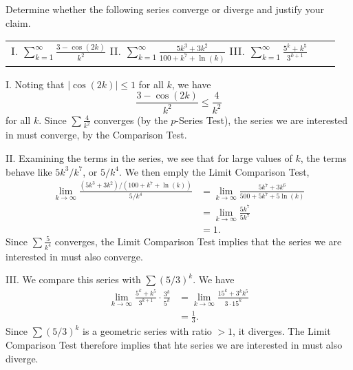 \documentclass[]{ximera}
\begin{document}
\begin{problem}
Determine whether the following series converge or diverge and justify your claim.
\begin{center}
\begin{tabular}{lll}
I. $\sum_{k=1}^\infty \frac{3-\cos(2k)}{k^2}$ \hspace{.3in} II. $\sum_{k=1}^\infty \frac{5k^3+3k^2}{100 + k^7 + \ln(k)}$ \hspace{.3in} III. $\sum_{k=1}^\infty \frac{5^k + k^5}{3^{k+1}}$
\end{tabular}
\end{center}

\begin{solution}
I. Noting that $|\cos(2k)| \leq 1$ for all $k$, we have
$$
\frac{3-\cos(2k)}{k^2} \leq \frac{4}{k^2}
$$
for all $k$. Since $\sum \frac{4}{k^2}$ converges (by the $p$-Series Test), the series we are interested in must converge, by the Comparison Test.

II. Examining the terms in the series, we see that for large values of $k$, the terms behave like $5k^3/k^7$, or $5/k^4$. We then emply the Limit Comparison Test,
\begin{align*}
\lim_{k \rightarrow \infty} \frac{(5k^3+3k^2)/(100+k^7+\ln(k))}{5/k^4} &= \lim_{k \rightarrow \infty} \frac{5k^7 + 3k^6}{500+5k^7 + 5\ln(k)} \\
&= \lim_{k \rightarrow \infty}  \frac{5k^7}{5k^7} \\
&= 1.
\end{align*}
Since $\sum \frac{5}{k^4}$ converges, the Limit Comparison Test implies that the series we are interested in must also converge.

III. We compare this series with $\sum (5/3)^k$. We have 
\begin{align*}
\lim_{k \rightarrow \infty} \frac{5^k + k^5}{3^{k+1}} \cdot \frac{3^k}{5^k} &= \lim_{k \rightarrow \infty} \frac{15^k + 3^k k^5}{3 \cdot 15^k} \\
&= \frac{1}{3}.
\end{align*}
Since $\sum (5/3)^k$ is a geometric series with ratio $> 1$, it diverges. The Limit Comparison Test therefore implies that hte series we are interested in must also diverge.
\end{solution}
\end{problem}
\end{document}
